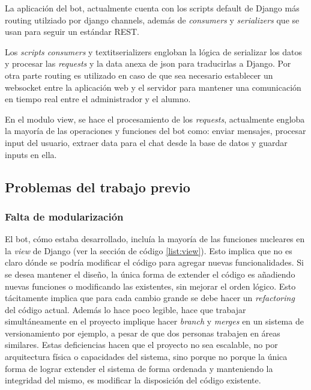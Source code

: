         \par La aplicación del bot, actualmente cuenta con los scripts default de Django más routing utilziado por django channels, además de \textit{consumers} y \textit{serializers} que se usan para seguir un estándar \gls{REST}.
        
        \par Los \textit{scripts consumers} y textit{serializers} engloban la lógica de serializar los datos y procesar las \textit{requests} y la data anexa de json para traducirlas a \gls{Django}. Por otra parte routing es utilizado en caso de que sea necesario establecer un \gls{websocket} entre la aplicación web y el servidor para mantener una comunicación en tiempo real entre el administrador y el alumno.
        
        \par En el modulo view, se hace el procesamiento de los \textit{requests}, actualmente engloba la mayoría de las operaciones y funciones del bot como: enviar mensajes, procesar input del usuario, extraer data para el chat desde la base de datos y guardar inputs en ella.

    \subsection{Problemas del trabajo previo}
        \subsubsection{Falta de modularización}
            \par El bot, cómo estaba desarrollado, incluía la mayoría de las funciones nucleares en la \textit{view} de \gls{Django} (ver la sección de código \ref{list:view}). Esto implica que no es claro dónde se podría modificar el código para agregar nuevas funcionalidades. Si se desea mantener el diseño, la única forma de extender el código es añadiendo nuevas funciones o modificando las existentes, sin mejorar el orden lógico. Esto tácitamente implica que para cada cambio grande se debe hacer un \textit{refactoring} del código actual. Además lo hace poco legible, hace que trabajar simultáneamente en el proyecto implique hacer \textit{branch} y \textit{merges} en un sistema de versionamiento por ejemplo, a pesar de que dos personas trabajen en áreas similares. Estas deficiencias hacen que el proyecto no sea escalable, no por arquitectura física o capacidades del sistema, sino porque no porque la única forma de lograr extender el sistema de forma ordenada y manteniendo la integridad del mismo, es modificar la disposición del código existente. 
            
